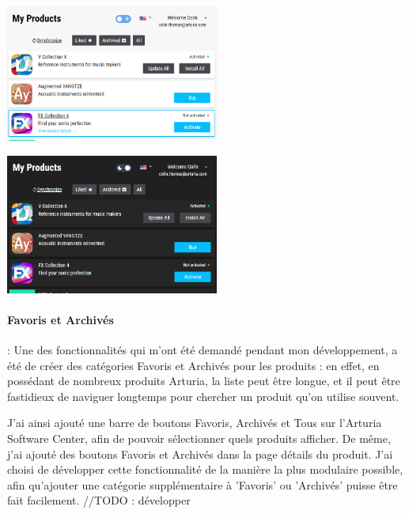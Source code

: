 \documentclass[francais]{rapportPFE}  %
\begin{document}
\begin{center}
    \centering
    \begin{minipage}{.5\textwidth}
    \centering
    \includegraphics[width=7cm]{graphics/daymode.png}
    \label{fig:test1}
    \end{minipage}%
    \begin{minipage}{.5\textwidth}
    \centering
    \includegraphics[width=7cm]{graphics/darkmode.png}
    \label{fig:test2}
    \end{minipage}
    \end{center}


\paragraph{Favoris et Archivés}: 
Une des fonctionnalités qui m'ont été demandé pendant mon développement, a été de créer des catégories Favoris et Archivés pour les produits : en effet, en possédant de nombreux produits Arturia, la liste peut être longue, et il peut être fastidieux de naviguer longtemps pour chercher un produit qu'on utilise souvent.

J'ai ainsi ajouté une barre de boutons Favoris, Archivés et Tous sur l'Arturia Software Center, afin de pouvoir sélectionner quels produits afficher.
De même, j'ai ajouté des boutons Favoris et Archivés dans la page détails du produit. 
J'ai choisi de développer cette fonctionnalité de la manière la plus modulaire possible, afin qu'ajouter une catégorie supplémentaire à 'Favoris' ou 'Archivés' puisse être fait facilement. //TODO : développer
\end{document}
